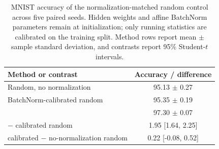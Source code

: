 \begin{table}[H]
\centering
\small
\caption{MNIST accuracy of the normalization-matched random control across five paired seeds. Hidden weights and affine BatchNorm parameters remain at initialization; only running statistics are calibrated on the training split. Method rows report mean $\pm$ sample standard deviation, and contrasts report 95\% Student-$t$ intervals.}
\label{tab:normalization-control}
\begin{tabular}{lc}
\toprule
Method or contrast & Accuracy / difference \\
\midrule
Random, no normalization & 95.13 $\pm$ 0.27 \\
BatchNorm-calibrated random & 95.35 $\pm$ 0.19 \\
\TeReLOffline{} & 97.30 $\pm$ 0.07 \\
\midrule
\TeReLOffline{} $-$ calibrated random & 1.95 [1.64, 2.25] \\
calibrated $-$ no-normalization random & 0.22 [-0.08, 0.52] \\
\bottomrule
\end{tabular}
\end{table}
